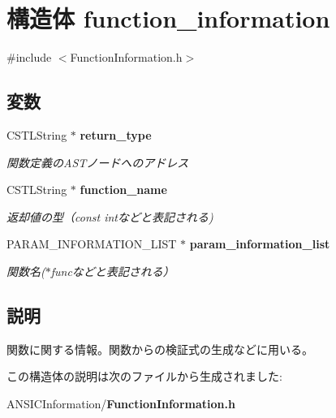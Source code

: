 \section{構造体 function\_\-information}
\label{structfunction__information}


{\ttfamily \#include $<$FunctionInformation.h$>$}

\subsection*{変数}
\begin{DoxyCompactItemize}
\item 
CSTLString $\ast$ {\bf return\_\-type}\label{structfunction__information_a2b02003e288d807bc956d740d56e7e0b}

\begin{DoxyCompactList}\small\item\em 関数定義のASTノードへのアドレス \item\end{DoxyCompactList}\item 
CSTLString $\ast$ {\bf function\_\-name}\label{structfunction__information_aa138620bc112025eb61bda9efa4e2f24}

\begin{DoxyCompactList}\small\item\em 返却値の型（const intなどと表記される) \item\end{DoxyCompactList}\item 
PARAM\_\-INFORMATION\_\-LIST $\ast$ {\bf param\_\-information\_\-list}\label{structfunction__information_a494d2b5b09c191eda0f90b9bf8adc952}

\begin{DoxyCompactList}\small\item\em 関数名($\ast$funcなどと表記される） \item\end{DoxyCompactList}\end{DoxyCompactItemize}


\subsection{説明}
関数に関する情報。関数からの検証式の生成などに用いる。 

この構造体の説明は次のファイルから生成されました:\begin{DoxyCompactItemize}
\item 
ANSICInformation/{\bf FunctionInformation.h}\end{DoxyCompactItemize}
